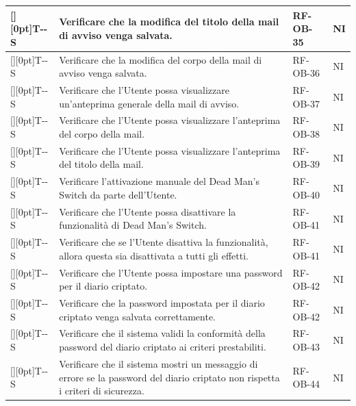 \documentclass[a4paper,12pt]{article}
\newcounter{testsys}
\newcommand{\systestcode}{%
  \raisebox{0pt}[\height][0pt]{\hypertarget{T-\arabic{testsys}-S}{}}T-\arabic{testsys}-S%
}
\begin{document}
\begin{longtable}{| >{\centering\arraybackslash}p{} | >{\raggedright\arraybackslash}p{} | >{\centering\arraybackslash}p{} | >{\centering\arraybackslash}p{} |}
\stepcounter{testsys} \systestcode & Verificare che la modifica del titolo della mail di avviso venga salvata. & RF-OB-35 & NI \\
\hline

\stepcounter{testsys} \systestcode & Verificare che la modifica del corpo della mail di avviso venga salvata. & RF-OB-36 & NI \\
\hline

\stepcounter{testsys} \systestcode & Verificare che l'Utente possa visualizzare un'anteprima generale della mail di avviso. & RF-OB-37 & NI \\
\hline

\stepcounter{testsys} \systestcode & Verificare che l'Utente possa visualizzare l'anteprima del corpo della mail. & RF-OB-38 & NI \\
\hline

\stepcounter{testsys} \systestcode & Verificare che l'Utente possa visualizzare l'anteprima del titolo della mail. & RF-OB-39 & NI \\
\hline

\stepcounter{testsys} \systestcode & Verificare l'attivazione manuale del Dead Man's Switch da parte dell'Utente. & RF-OB-40 & NI \\
\hline

\stepcounter{testsys} \systestcode & Verificare che l'Utente possa disattivare la funzionalità di Dead Man's Switch. & RF-OB-41 & NI \\
\hline

\stepcounter{testsys} \systestcode & Verificare che se l'Utente disattiva la funzionalità, allora questa sia disattivata a tutti gli effetti. & RF-OB-41 & NI \\
\hline

\stepcounter{testsys} \systestcode & Verificare che l'Utente possa impostare una password per il diario criptato. & RF-OB-42 & NI \\
\hline

\stepcounter{testsys} \systestcode & Verificare che la password impostata per il diario criptato venga salvata correttamente. & RF-OB-42 & NI \\
\hline

\stepcounter{testsys} \systestcode & Verificare che il sistema validi la conformità della password del diario criptato ai criteri prestabiliti. & RF-OB-43 & NI \\
\hline

\stepcounter{testsys} \systestcode & Verificare che il sistema mostri un messaggio di errore se la password del diario criptato non rispetta i criteri di sicurezza. & RF-OB-44 & NI \\
\hline


\end{longtable}
\end{document}
